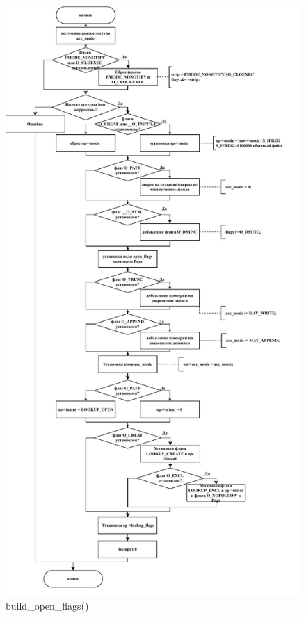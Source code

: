 \begin{figure}[ht]
	\centering
	\includegraphics[scale=0.7]{img/build_open_flags.pdf}
	\caption{build\_open\_flags()}
\end{figure}


